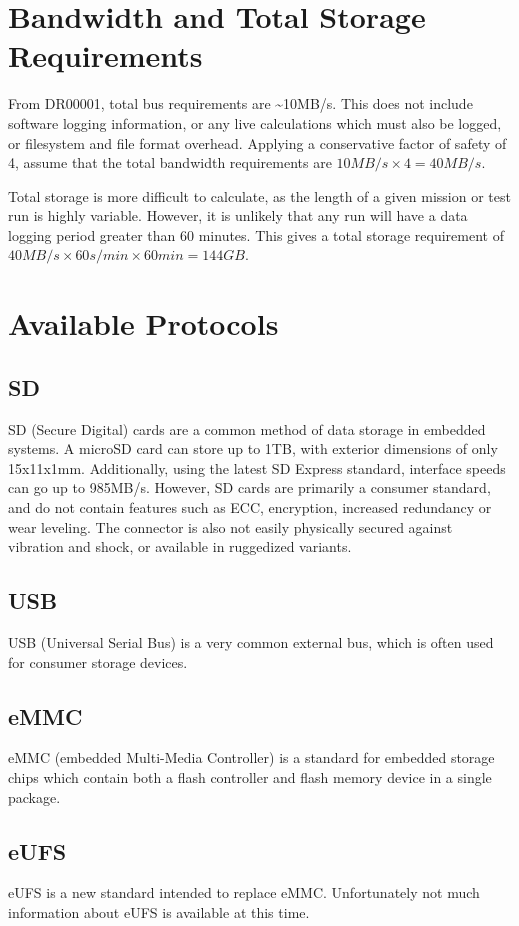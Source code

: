 \documentclass[12pt,article]{memoir}
\begin{document}
\chapter{Bandwidth and Total Storage Requirements}
From DR00001, total bus requirements are \textasciitilde 10MB/s. This does not include software logging information, or any live calculations which must also be logged, or filesystem and file format overhead. Applying a conservative factor of safety of 4, assume that the total bandwidth requirements are $10MB/s \times 4 = 40MB/s$.\par
Total storage is more difficult to calculate, as the length of a given mission or test run is highly variable. However, it is unlikely that any run will have a data logging period greater than 60 minutes. This gives a total storage requirement of $40MB/s \times 60s/min \times 60min = 144GB$.
\newpage

\chapter{Available Protocols}
\section{SD}
SD (Secure Digital) cards are a common method of data storage in embedded systems. A microSD card can store up to 1TB, with exterior dimensions of only 15x11x1mm. Additionally, using the latest SD Express standard, interface speeds can go up to 985MB/s. However, SD cards are primarily a consumer standard, and do not contain features such as ECC, encryption, increased redundancy or wear leveling. The connector is also not easily physically secured against vibration and shock, or available in ruggedized variants.
\section{USB}
USB (Universal Serial Bus) is a very common external bus, which is often used for consumer storage devices.
\section{eMMC}
eMMC (embedded Multi-Media Controller) is a standard for embedded storage chips which contain both a flash controller and flash memory device in a single package.
\section{eUFS}
eUFS is a new standard intended to replace eMMC. Unfortunately not much information about eUFS is available at this time.
\end{document}
